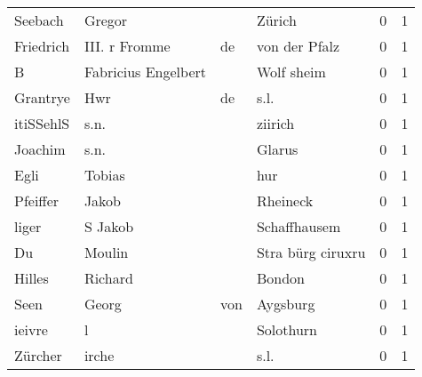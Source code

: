 \documentclass[10pt,a4paper,landscape]{article}
\begin{document}
\begin{longtable}{llllrr}
                  Seebach &                             Gregor &             &                                      Zürich &          0 &         1 \\
                Friedrich &                      III. r Fromme &          de &                               von der Pfalz &          0 &         1 \\
                        B &                Fabricius Engelbert &             &                                  Wolf sheim &          0 &         1 \\
                 Grantrye &                                Hwr &          de &                                        s.l. &          0 &         1 \\
                itiSSehlS &                               s.n. &             &                                     ziirich &          0 &         1 \\
                  Joachim &                               s.n. &             &                                      Glarus &          0 &         1 \\
                     Egli &                             Tobias &             &                                         hur &          0 &         1 \\
                 Pfeiffer &                              Jakob &             &                                    Rheineck &          0 &         1 \\
                    liger &                            S Jakob &             &                                Schaffhausem &          0 &         1 \\
                       Du &                             Moulin &             &                           Stra bürg ciruxru &          0 &         1 \\
                   Hilles &                            Richard &             &                                      Bondon &          0 &         1 \\
                     Seen &                              Georg &         von &                                    Aygsburg &          0 &         1 \\
                   ieivre &                                  l &             &                                   Solothurn &          0 &         1 \\
                  Zürcher &                              irche &             &                                        s.l. &          0 &         1 \\

\end{longtable}
\end{document}
